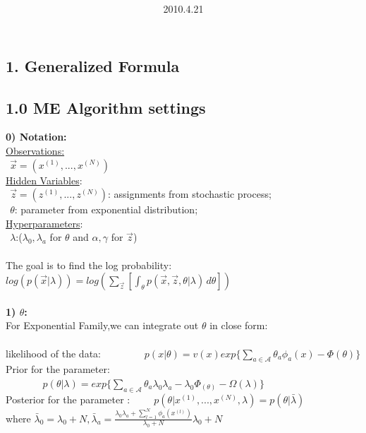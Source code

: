 \documentclass{article}
\title{\vspace{0.3in}\textmd{\textbf{\hmwkTitle}}}
\date{2010.4.21}
\author{\textbf{\hmwkAuthorName}}
\begin{document}
\begin{spacing}{1.1}
\maketitle



  
\section{1. Generalized Formula}
\subsection{1.0  ME Algorithm settings} 
\large {\bf 0) Notation:}\\
 \underline{Observations:}\\
  $\ \ \vec x=(x^{(1)},...,x^{(N)})$  \\
 \underline{Hidden Variables}:\\
  $\ \ \vec z=(z^{(1)},...,z^{(N)})$: assignments from stochastic process;\\    
  $\ \ \theta$: parameter from exponential distribution;\\ 
 \underline{Hyperparameters}:\\
 $\ \ \lambda$:($\lambda_{0},\lambda_{a}$ for $\theta$ and $\alpha,\gamma$ for $\vec z$) \\ \\
The goal is to find the log probability: $log(p(\vec x|\lambda))=log(\sum_{\vec z} [\int_\theta \! p(\vec x,\vec z,\theta|\lambda) \, d\theta])$\\ \\
\large {\bf 1) $\theta$:}\\
For Exponential Family,we can integrate out $\theta$ in close form: \\ \\
likelihood of the data:$\ \ \ \ \ \ \ \ \ \ \ \ \ \ \ \ \ \ \ \ p(x|\theta)=v(x)exp\{\sum_{a \in \mathcal{A}} \theta_{a}\phi_{a}(x)-\Phi(\theta) \}$ \\ 
Prior for the parameter:$\ \ \ \ \ \ \ \ \ \ \ \ \ \ \ \ \   p(\theta|\lambda)=exp\{\sum_{a\in\mathcal{A}} \theta_{a}\lambda_{0}\lambda_{a}-\lambda_{0}\Phi_(\theta)-\Omega(\lambda) \}$\\ 
Posterior for the parameter :$\ \ \ \ \ \ \ \ \ \ \ p(\theta|x^{(1)},...,x^{(N)},\lambda)=p(\theta|\bar \lambda)$ \\
where $ \bar \lambda_{0}=\lambda_{0}+N,\bar \lambda_{a}=\frac{\lambda_{0}\lambda_{a}+\sum_{l=1}^{N}\phi_{a}(x^{(l)})}{\lambda_{0}+N}\lambda_{0}+N $\\

\end{spacing}
\end{document}
